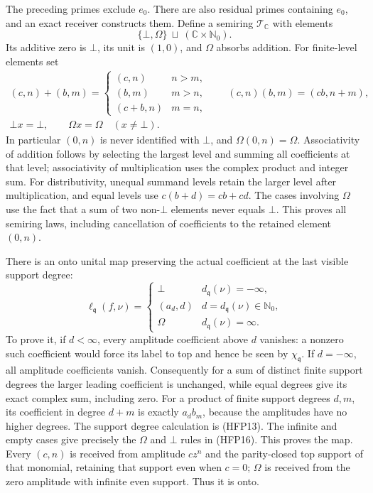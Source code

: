 The preceding primes exclude $e_0$. There are also residual
primes containing $e_0$, and an exact receiver constructs them.
Define a semiring $\mathscr T_{\mathbb C}$ with elements
\begin{equation}\tag{HFP15}
 \{\bot,\Omega\}\ \sqcup\ (\mathbb C\times\mathbb N_0).
\end{equation}
Its additive zero is $\bot$, its unit is $(1,0)$, and $\Omega$
absorbs addition. For finite-level elements set
\begin{equation}\tag{HFP16}
\begin{gathered}
 (c,n)+(b,m)=
 \begin{cases}(c,n)&n>m,\\(b,m)&m>n,\\(c+b,n)&m=n,
 \end{cases}
 \qquad (c,n)(b,m)=(cb,n+m),\\
 \bot x=\bot,\qquad
 \Omega x=\Omega\quad(x\ne\bot).
\end{gathered}
\end{equation}
In particular $(0,n)$ is never identified with $\bot$, and
$\Omega(0,n)=\Omega$. Associativity of addition follows by
selecting the largest level and summing all coefficients at
that level; associativity of multiplication uses the complex
product and integer sum. For distributivity, unequal summand
levels retain the larger level after multiplication, and equal
levels use $c(b+d)=cb+cd$. The cases involving $\Omega$ use
the fact that a sum of two non-$\bot$ elements never equals
$\bot$. This proves all semiring laws, including cancellation
of coefficients to the retained element $(0,n)$.

There is an onto unital map preserving the actual coefficient
at the last visible support degree:
\begin{equation}\tag{HFP17}
 \ell_{\mathfrak q}(f,\nu)=
 \begin{cases}
 \bot&d_{\mathfrak q}(\nu)=-\infty,\\
 (a_d,d)&d=d_{\mathfrak q}(\nu)\in\mathbb N_0,\\
 \Omega&d_{\mathfrak q}(\nu)=\infty.
 \end{cases}
\end{equation}
To prove it, if $d<\infty$, every amplitude coefficient above
$d$ vanishes: a nonzero such coefficient would force its
label to top and hence be seen by $\chi_{\mathfrak q}$.
If $d=-\infty$, all amplitude coefficients vanish.
Consequently for a sum of distinct finite support degrees
the larger leading coefficient is unchanged, while equal
degrees give its exact complex sum, including zero. For a
product of finite support degrees $d,m$, its coefficient
in degree $d+m$ is exactly $a_db_m$, because the amplitudes
have no higher degrees. The support degree calculation is
(HFP13). The infinite and empty cases give precisely the
$\Omega$ and $\bot$ rules in (HFP16). This proves the map.
Every $(c,n)$ is received from amplitude $cz^n$ and the
parity-closed top support of that monomial, retaining that
support even when $c=0$; $\Omega$ is received from the
zero amplitude with infinite even support. Thus it is onto.

